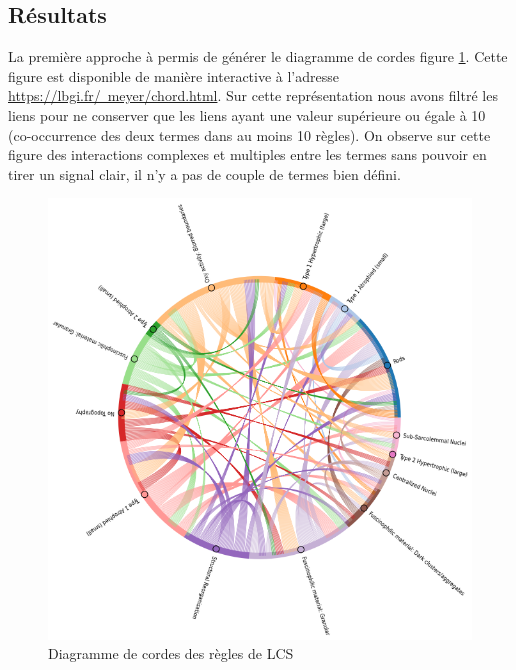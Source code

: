 \subsection{Résultats}
La première approche à permis de générer le diagramme de cordes figure \ref{fig:chords}.  Cette figure est disponible de manière interactive à l'adresse \href{https://lbgi.fr/~meyer/chord.html}{https://lbgi.fr/~meyer/chord.html}. Sur cette représentation nous avons filtré les liens pour ne conserver que les liens ayant une valeur supérieure ou égale à 10 (co-occurrence des deux termes dans au moins 10 règles). On observe sur cette figure des interactions complexes et multiples entre les termes sans pouvoir en tirer un signal clair, il n'y a pas de couple de termes bien défini.
\begin{figure}[htbp]
  \centering
  \includegraphics[width=1\textwidth]{figures/chord_plot.png}
  \caption[Diagramme de cordes des règles de LCS]{Diagramme de cordes des règles de LCS}
  \label{fig:chords}
\end{figure}
